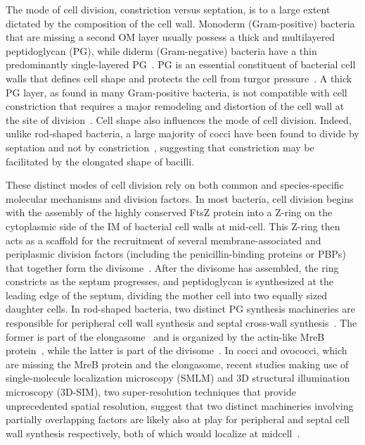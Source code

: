 The mode of cell division, constriction versus septation, is to a large extent dictated by the composition of the cell wall.
Monoderm (Gram-positive) bacteria that are missing a second OM layer usually possess a thick and multilayered peptidoglycan (PG), while diderm (Gram-negative) bacteria have a thin predominantly single-layered PG~\cite{gardePeptidoglycanStructureSynthesis2021}.
PG is an essential constituent of bacterial cell walls that defines cell shape and protects the cell from turgor pressure~\cite{gardePeptidoglycanStructureSynthesis2021}.
A thick PG layer, as found in many Gram-positive bacteria, is not compatible with cell constriction that requires a major remodeling and distortion of the cell wall at the site of division~\cite{nguyenSimulationsSuggestConstrictive2019}.
Cell shape also influences the mode of cell division.
Indeed, unlike rod-shaped bacteria, a large majority of cocci have been found to divide by septation and not by constriction~\cite{zapunDifferentShapesCocci2008,pinhoHowGetMechanisms2013}, suggesting that constriction may be facilitated by the elongated shape of bacilli.

These distinct modes of cell division rely on both common and species-specific molecular mechanisms and division factors.
In most bacteria, cell division begins with the assembly of the highly conserved FtsZ protein into a Z-ring on the cytoplasmic side of the IM of bacterial cell walls at mid-cell.
This Z-ring then acts as a scaffold for the recruitment of several membrane-associated and periplasmic division factors (including the penicillin-binding proteins or PBPs) that together form the divisome~\cite{pinhoHowGetMechanisms2013}.
After the divisome has assembled, the ring constricts as the septum progresses, and peptidoglycan is synthesized at the leading edge of the septum, dividing the mother cell into two equally sized daughter cells.
In rod-shaped bacteria, two distinct PG synthesis machineries are responsible for peripheral cell wall synthesis and septal cross-wall synthesis~\cite{eganRegulationPeptidoglycanSynthesis2020}.
The former is part of the elongasome~\cite{eganRegulationPeptidoglycanSynthesis2020} and is organized by the actin-like MreB protein~\cite{eganRegulationBacterialCell2017}, while the latter is part of the divisome~\cite{duAssemblyActivationEscherichia2017,denblaauwenDivisome25Road2017}.
In cocci and ovococci, which are missing the MreB protein and the elongasome, recent studies making use of single-molecule localization microscopy (SMLM) and 3D structural illumination microscopy (3D-SIM), two super-resolution techniques that provide unprecedented spatial resolution, suggest that two distinct machineries involving partially overlapping factors are likely also at play for peripheral and septal cell wall synthesis respectively, both of which would localize at midcell~\cite{pinhoHowGetMechanisms2013,trouveNanoscaleDynamicsPeptidoglycan2021,perezOrganizationPeptidoglycanSynthesis2021,perez-nunezNewMorphogenesisPathway2011,lundMolecularCoordinationStaphylococcus2018}.

